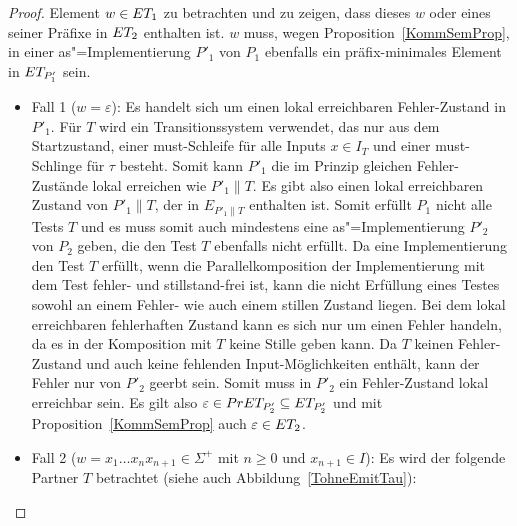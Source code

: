 \begin{proof}
  Element $w\in ET _1$ zu betrachten und zu zeigen, dass dieses $w$ oder eines
  seiner Präfixe in $ET _2$ enthalten ist. $w$ muss, wegen
  Proposition~\ref{KommSemProp}, in einer as"=Implementierung $P'_1$ von $P_1$
  ebenfalls ein präfix-minimales Element in $ET _{P'_1}$ sein.
  \begin{itemize}
    \item Fall 1 ($w=\varepsilon$): Es handelt sich um einen lokal erreichbaren
      Fehler-Zustand in $P'_1$. Für $T$ wird ein Transitionssystem verwendet,
      das nur aus dem Startzustand, einer must-Schleife für alle Inputs $x\in
      I_T$ und einer must-Schlinge für $\tau$ besteht. Somit kann $P'_1$ die im
      Prinzip gleichen Fehler-Zustände lokal erreichen wie $P'_1\|T$. Es gibt
      also einen lokal erreichbaren Zustand von $P'_1\|T$, der in $E_{P'_1\|T}$
      enthalten ist. Somit erfüllt $P_1$ nicht alle Tests $T$ und es muss somit
      auch mindestens eine as"=Implementierung $P'_2$ von $P_2$ geben, die den
      Test $T$ ebenfalls nicht erfüllt. Da eine Implementierung den Test $T$
      erfüllt, wenn die Parallelkomposition der Implementierung mit dem Test
      fehler- und stillstand-frei ist, kann die nicht Erfüllung eines Testes
      sowohl an einem Fehler- wie auch einem stillen Zustand liegen. Bei dem
      lokal erreichbaren fehlerhaften Zustand kann es sich nur um einen Fehler
      handeln, da es in der Komposition mit $T$ keine Stille geben kann. Da $T$
      keinen Fehler-Zustand und auch keine fehlenden Input-Möglichkeiten
      enthält, kann der Fehler nur von $P'_2$ geerbt sein. Somit muss in $P'_2$
      ein Fehler-Zustand lokal erreichbar sein. Es gilt also $\varepsilon \in
      PrET _{P'_2} \subseteq ET _{P'_2}$ und mit
      Proposition~\ref{KommSemProp} auch $\varepsilon\in ET _2$.
    \item Fall 2 ($w=x_1\dots x_n x_{n+1}\in\Sigma ^+$ mit $n\geq 0$ und
      $x_{n+1}\in I$): Es wird der folgende Partner $T$ betrachtet (siehe auch
      Abbildung~\ref{TohneEmitTau}):
\end{itemize}
\end{proof}
